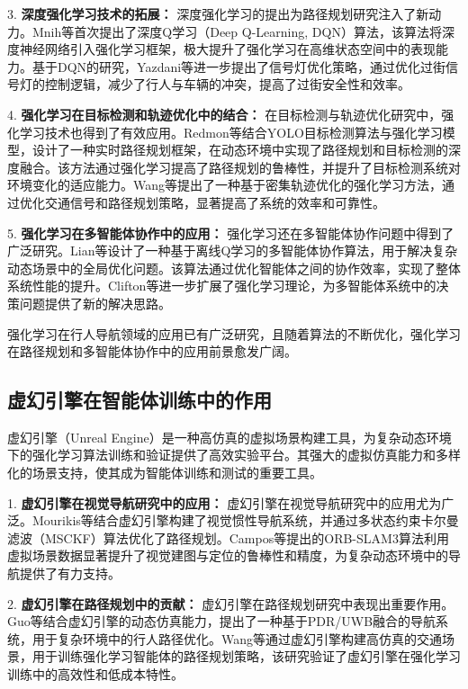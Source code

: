 3. \textbf{深度强化学习技术的拓展：} 深度强化学习的提出为路径规划研究注入了新动力。Mnih等\cite{mnih2013dqn}首次提出了深度Q学习（Deep Q-Learning, DQN）算法，该算法将深度神经网络引入强化学习框架，极大提升了强化学习在高维状态空间中的表现能力。基于DQN的研究，Yazdani等\cite{yazdani2023ivpl}进一步提出了信号灯优化策略，通过优化过街信号灯的控制逻辑，减少了行人与车辆的冲突，提高了过街安全性和效率。

4. \textbf{强化学习在目标检测和轨迹优化中的结合：} 在目标检测与轨迹优化研究中，强化学习技术也得到了有效应用。Redmon等\cite{redmon2017yolo9000}结合YOLO目标检测算法与强化学习模型，设计了一种实时路径规划框架，在动态环境中实现了路径规划和目标检测的深度融合。该方法通过强化学习提高了路径规划的鲁棒性，并提升了目标检测系统对环境变化的适应能力。Wang等\cite{wang2013densetrajectory}提出了一种基于密集轨迹优化的强化学习方法，通过优化交通信号和路径规划策略，显著提高了系统的效率和可靠性。

5. \textbf{强化学习在多智能体协作中的应用：} 强化学习还在多智能体协作问题中得到了广泛研究。Lian等\cite{lian2023inverseql}设计了一种基于离线Q学习的多智能体协作算法，用于解决复杂动态场景中的全局优化问题。该算法通过优化智能体之间的协作效率，实现了整体系统性能的提升。Clifton等\cite{clifton2020qlearning}进一步扩展了强化学习理论，为多智能体系统中的决策问题提供了新的解决思路。

强化学习在行人导航领域的应用已有广泛研究，且随着算法的不断优化，强化学习在路径规划和多智能体协作中的应用前景愈发广阔。

\subsection*{虚幻引擎在智能体训练中的作用}

虚幻引擎（Unreal Engine）是一种高仿真的虚拟场景构建工具，为复杂动态环境下的强化学习算法训练和验证提供了高效实验平台。其强大的虚拟仿真能力和多样化的场景支持，使其成为智能体训练和测试的重要工具。

1. \textbf{虚幻引擎在视觉导航研究中的应用：} 虚幻引擎在视觉导航研究中的应用尤为广泛。Mourikis等\cite{mourikis2007msckf}结合虚幻引擎构建了视觉惯性导航系统，并通过多状态约束卡尔曼滤波（MSCKF）算法优化了路径规划。Campos等\cite{campos2021orbslam3}提出的ORB-SLAM3算法利用虚拟场景数据显著提升了视觉建图与定位的鲁棒性和精度，为复杂动态环境中的导航提供了有力支持。

2. \textbf{虚幻引擎在路径规划中的贡献：} 虚幻引擎在路径规划研究中表现出重要作用。Guo等\cite{guo2020pdr}结合虚幻引擎的动态仿真能力，提出了一种基于PDR/UWB融合的导航系统，用于复杂环境中的行人路径优化。Wang等\cite{wang2023llio}通过虚幻引擎构建高仿真的交通场景，用于训练强化学习智能体的路径规划策略，该研究验证了虚幻引擎在强化学习训练中的高效性和低成本特性。

